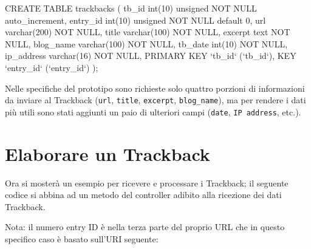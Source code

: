 \begin{code}
CREATE TABLE trackbacks (
 tb_id int(10) unsigned NOT NULL auto_increment,
 entry_id int(10) unsigned NOT NULL default 0,
 url varchar(200) NOT NULL,
 title varchar(100) NOT NULL,
 excerpt text NOT NULL,
 blog_name varchar(100) NOT NULL,
 tb_date int(10) NOT NULL,
 ip_address varchar(16) NOT NULL,
 PRIMARY KEY `tb_id` (`tb_id`),
 KEY `entry_id` (`entry_id`)
);
\end{code}

Nelle specifiche del prototipo sono richieste solo quattro porzioni di informazioni da inviare al Trackback  (\verb|url|, \verb|title|, \verb|excerpt|, \verb|blog_name|),  ma per rendere i dati più utili sono stati aggiunti un paio di ulteriori campi (\verb|date|, \verb|IP address|, etc.).

\section*{Elaborare un Trackback}
Ora si mosterà un esempio per ricevere e processare i Trackback; il seguente codice si abbina ad un metodo del controller adibito alla ricezione dei dati Trackback.


Nota: il numero entry ID è nella terza parte del proprio URL che in questo specifico caso è basato sull'URI seguente:

